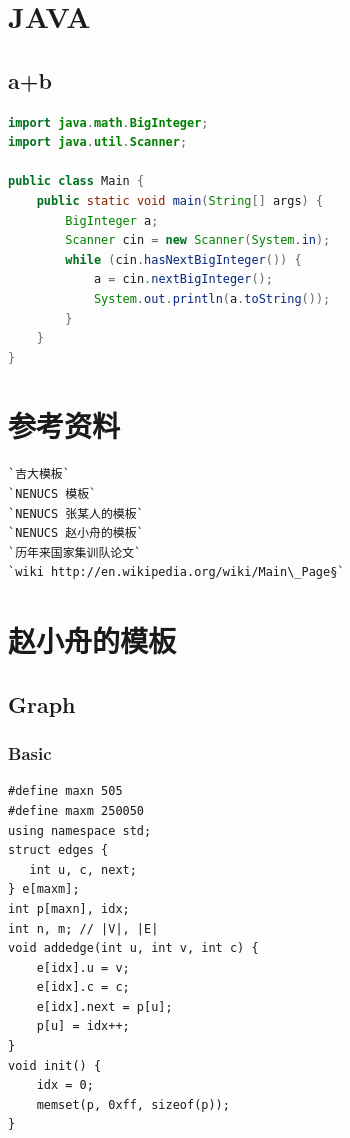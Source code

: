 \documentclass[a4paper]{article}
\begin{document}
\begin{CJK*}{UTF8}{gbsn}
\begin{multicols}{3}
\begin{flushleft}
\section{JAVA}
\subsection{a+b}
\begin{lstlisting}[language={Java}]
import java.math.BigInteger;
import java.util.Scanner;

public class Main {
    public static void main(String[] args) {
        BigInteger a;
        Scanner cin = new Scanner(System.in);
        while (cin.hasNextBigInteger()) {
            a = cin.nextBigInteger();
            System.out.println(a.toString());
        }
    }
}
\end{lstlisting}

\section{参考资料}
\begin{lstlisting}
`吉大模板`
`NENUCS 模板`
`NENUCS 张某人的模板`
`NENUCS 赵小舟的模板`
`历年来国家集训队论文`
`wiki http://en.wikipedia.org/wiki/Main\_Page§`
\end{lstlisting}





\section{赵小舟的模板}

\subsection{Graph}

\subsubsection{Basic}

\begin{lstlisting}
#define maxn 505
#define maxm 250050
using namespace std;
struct edges {
   int u, c, next;
} e[maxm];
int p[maxn], idx;
int n, m; // |V|, |E|
void addedge(int u, int v, int c) {
    e[idx].u = v;
    e[idx].c = c;
    e[idx].next = p[u];
    p[u] = idx++;
}
void init() {
    idx = 0;
    memset(p, 0xff, sizeof(p));
}
\end{lstlisting}


\end{flushleft}
\end{multicols}
\end{CJK*}
\end{document}
